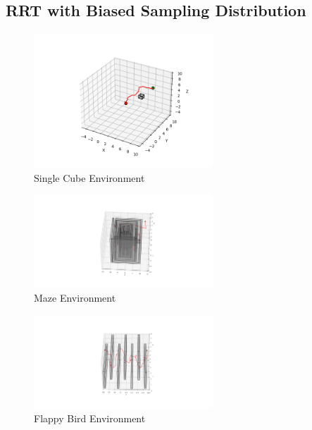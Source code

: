 \documentclass[conference]{IEEEtran}
\begin{document}
\subsection{RRT with Biased Sampling Distribution}
\begin{figure}[H]
    \centering
    \includegraphics[width=0.6\textwidth]{cube_rrt_b.png}
    \caption{Single Cube Environment}
    \label{fig:cube_rrt_biased}
\end{figure}
\begin{figure}[H]
    \centering
    \includegraphics[width=0.6\textwidth]{maze_rrt_b.png}
    \caption{Maze Environment}
    \label{fig:maze_rrt_biased}
\end{figure}
\begin{figure}[H]
    \centering
    \includegraphics[width=0.6\textwidth]{flappy_bird_rrt_b.png}
    \caption{Flappy Bird Environment}
    \label{fig:flappy_bird_rrt_biased}
\end{figure}
\end{document}
